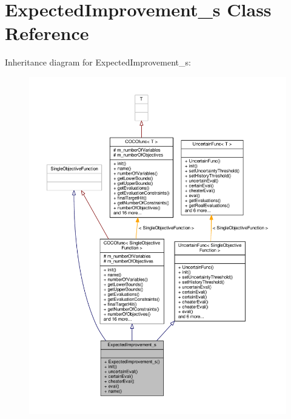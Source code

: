 \hypertarget{classExpectedImprovement__s}{}\section{Expected\+Improvement\+\_\+s Class Reference}
\label{classExpectedImprovement__s}


Inheritance diagram for Expected\+Improvement\+\_\+s\+:
\nopagebreak
\begin{figure}[H]
\begin{center}
\leavevmode
\includegraphics[width=350pt]{classExpectedImprovement__s__inherit__graph}
\end{center}
\end{figure}


